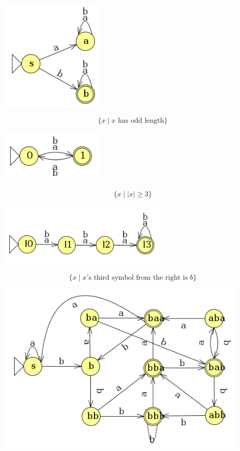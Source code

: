 \documentclass{math}
\begin{document}
\begin{enumerate}
\begin{enumerate}
    \begin{center}
      \includegraphics[width=5cm]{assets/hw_03_5.png}
    \end{center}
    \[ \{x\mid x\text{ has odd length}\} \]
    \begin{center}
      \includegraphics[width=5cm]{assets/hw_03_6.png}
    \end{center}
    \[ \{x\mid|x|\geq3\} \]
    \begin{center}
      \includegraphics[width=8cm]{assets/hw_03_7.png}
    \end{center}
    \[ \{x\mid x\text{'s third symbol from the right is } b\} \]
    \begin{center}
      \includegraphics[width=12cm]{assets/hw_03_8.png}

\end{center}
\end{enumerate}
\end{enumerate}
\end{document}

